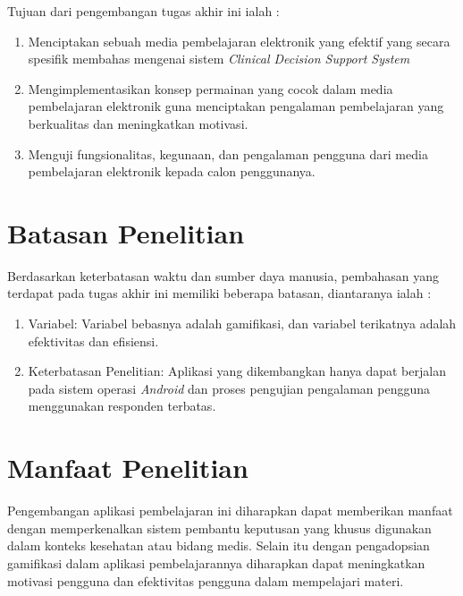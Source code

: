 Tujuan dari pengembangan tugas akhir ini ialah :
\begin{enumerate}
	\item Menciptakan sebuah media pembelajaran elektronik yang efektif yang secara spesifik membahas mengenai sistem \textit{Clinical Decision Support System}
	\item Mengimplementasikan konsep permainan yang cocok dalam media pembelajaran elektronik guna menciptakan pengalaman pembelajaran yang berkualitas dan meningkatkan motivasi.
	\item Menguji fungsionalitas, kegunaan, dan pengalaman pengguna dari media pembelajaran elektronik kepada calon penggunanya.
\end{enumerate}

\section{Batasan Penelitian}
Berdasarkan keterbatasan waktu dan sumber daya manusia, pembahasan yang terdapat pada tugas akhir ini memiliki beberapa batasan, diantaranya ialah :
\begin{enumerate}
\item Variabel: Variabel bebasnya adalah gamifikasi, dan variabel terikatnya adalah efektivitas dan efisiensi.
\item Keterbatasan Penelitian: Aplikasi yang dikembangkan hanya dapat berjalan pada sistem operasi \textit{Android} dan proses pengujian pengalaman pengguna menggunakan responden terbatas.
\end{enumerate}

\section{Manfaat Penelitian}
Pengembangan aplikasi pembelajaran ini diharapkan dapat memberikan manfaat dengan memperkenalkan sistem pembantu keputusan yang khusus digunakan dalam konteks kesehatan atau bidang medis.
Selain itu dengan pengadopsian gamifikasi dalam aplikasi pembelajarannya diharapkan dapat meningkatkan motivasi pengguna dan efektivitas pengguna dalam mempelajari materi.
